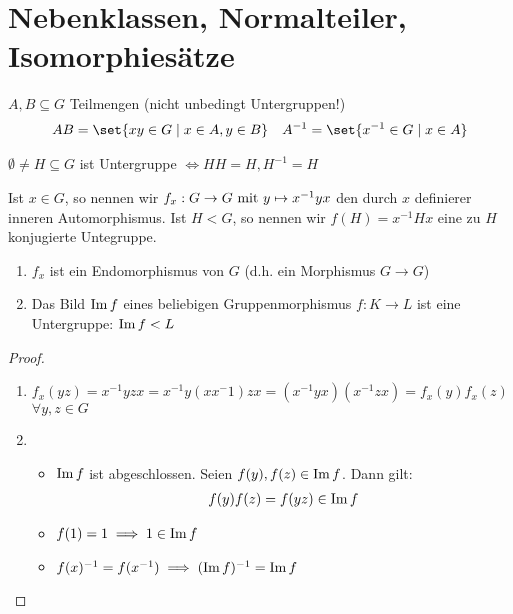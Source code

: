 \section{Nebenklassen, Normalteiler, Isomorphiesätze}
\begin{definition}
	$A,B \subseteq G$ Teilmengen (nicht unbedingt Untergruppen!)
	\begin{align*}
		AB = \set{xy \in G \mid x \in A, y \in B} \quad A^{-1} = \set{x^{-1} \in G \mid x \in A}
	\end{align*}
\end{definition}
\begin{remark}
	$\emptyset \neq H \subseteq G$ ist Untergruppe $\Leftrightarrow HH = H, H^{-1} = H$
\end{remark}
\begin{definition}
	Ist $x \in G$, so nennen wir $f_x : G \to G \mit y \mapsto x^{-1}yx$ den durch $x$ definierer inneren Automorphismus. Ist $H < G$, so nennen wir $f(H) = x^{-1}Hx$ eine zu $H$ konjugierte Untegruppe.
\end{definition}
\begin{proposition}
	\begin{enumerate}
		\item $f_x$ ist ein Endomorphismus von $G$ (d.h. ein Morphismus $G \to G$)
		\item Das Bild $\Image f$ eines beliebigen Gruppenmorphismus $f: K \to L$ ist eine Untergruppe: $\Image f < L$
	\end{enumerate}
\end{proposition}
\begin{proof}
	\begin{enumerate}
		\item $f_x (yz) = x^{-1}yzx = x^{-1}y(xx{^-1})zx = (x^{-1}yx)(x^{-1}zx) = f_x(y)f_x(z)$ $\forall y,z \in G$
		\item 
		\begin{itemize}
			\item $\Image f$ ist abgeschlossen. Seien $f(y), f(z) \in \Image f$. Dann gilt:
			\begin{align*}
			f(y)f(z) = f(yz) \in \Image f
			\end{align*}
			\item $f(1) = 1 \implies 1 \in \Image f$
			\item $f(x)^{-1} = f(x^{-1}) \implies (\Image f)^{-1} = \Image f$
		\end{itemize}
	\end{enumerate}
\end{proof}
